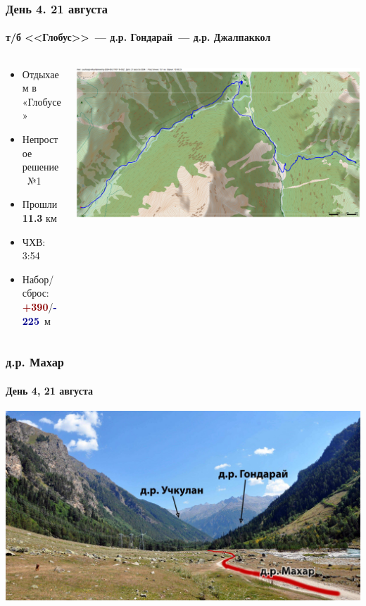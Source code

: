 	\begin{frame}
	\frametitle{День 4. 21 августа}
	\framesubtitle{ т/б <<Глобус>>~--- д.р. Гондарай~--- д.р. Джалпаккол} %
	\begin{columns}[c] %
		\begin{column}{0.45\textwidth} %
			\begin{itemize}
				\item Отдыхаем в «Глобусе»
				\item Непростое решение\texttrademark~№1
				\item Прошли \textbf{11.3} км
				\item ЧХВ: 3:54
				\item Набор/сброс: \textcolor{darkred}{\textbf{+390}}/\textcolor{darkblue}{\textbf{-225}}~м
			\end{itemize}
			
		\end{column}
		\begin{column}{0.5\textwidth} %
			\centering
			\includegraphics[width=\linewidth]{../pics/mini_maps/21}
		\end{column}
	\end{columns}
\end{frame}

\begin{frame}
	\frametitle{д.р. Махар}
	\framesubtitle{День 4, 21 августа}
	\centering
	\includegraphics[width=\textwidth]{../pics/DSC_1003}			
\end{frame}

